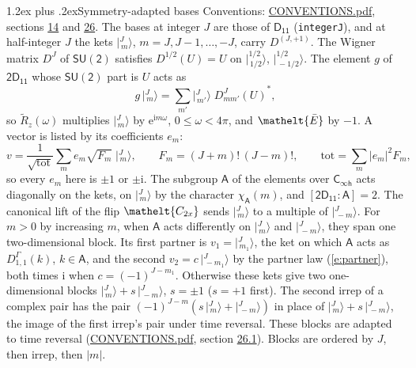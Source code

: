 \documentclass[10pt,a4paper]{article}
\makeatletter
\renewcommand\section{\@startsection{section}{1}{\z@}{-3ex plus -1ex minus -.2ex}%
  {1.2ex plus .2ex}{\normalfont\large\sffamily\bfseries\color{parttitle}}}
\numberwithin{equation}{section}
\newcommand{\eltfont}[1]{{\let\sigma\eltsigma\mathelt{#1}}}
\newcommand{\grp}[1]{\mathsf{#1}}
\newcommand{\elt}[1]{\eltfont{#1}}
\newcommand{\grpindex}[2]{[#1 : #2]}
\newcommand{\iunit}{\mathrm{i}}
\newcommand{\expe}{\mathrm{e}}
\newcommand{\irrJp}[2]{D^{(#1,#2)}}
\newcommand{\repD}[1]{D^{#1}}
\newcommand{\wignerD}[1]{D^{#1}}
\newcommand{\chiA}{\chi_{\grp{A}}}
\newcommand{\conj}[1]{{#1}^{*}}
\newcommand{\jm}[2]{\bigl\lvert{}^{#1}_{\,#2}\bigr\rangle}
\newcommand{\barred}[1]{\bar{#1}}
\newcommand{\lift}[1]{\tilde{#1}}
\makeatother
\begin{document}
\section{Symmetry-adapted bases}\label{s:bases}
Conventions: \href{../../CONVENTIONS.pdf}{CONVENTIONS.pdf}, sections \href{../../../rotation/CONVENTIONS.pdf\#conv.14}{14} and \href{../../CONVENTIONS.pdf\#conv.26}{26}.
\leavevmode\label{n:index.m}\label{n:vector.ket}The bases at integer $J$ are those of \href{../../../rotation/data/pdf/D11.pdf}{$\grp{D_{11}}$} (\texttt{integerJ}), and at half-integer $J$ the kets $\jm{J}{m}$, $m = J, J-1, \dots, -J$, carry $\irrJp{J}{+1}$. \label{n:matrix.wigner}The Wigner matrix $\wignerD{J}$ of $\grp{SU(2)}$ satisfies $\wignerD{1/2}(U) = U$ on $\jm{1/2}{1/2}$, $\jm{1/2}{-1/2}$. The element $g$ of $\grp{2D_{11}}$ whose $\grp{SU(2)}$ part is $U$ acts as
\begin{equation}\label{e:action}g\,\jm{J}{m} = \sum_{m'} \jm{J}{m'}\; \conj{\wignerD{J}_{m m'}(U)},\end{equation}
so $\lift{R}_{z}(\omega)$ multiplies $\jm{J}{m}$ by $\expe^{\iunit m\omega}$, $0 \le \omega < 4\pi$, and $\elt{\barred{E}}$ by $-1$. \label{n:index.ketcoefficient}\label{n:vector.basis.symmetry}\label{n:index.ketweight}\label{n:index.total}A vector is listed by its coefficients $e_m$:
\begin{equation}\label{e:ket}v = \frac{1}{\sqrt{\mathrm{tot}}}\sum_m e_m\sqrt{F_m}\;\jm{J}{m},\qquad F_m = (J+m)!\,(J-m)!,\qquad \mathrm{tot} = \sum_m |e_m|^2F_m,\end{equation}
so every $e_m$ here is $\pm 1$ or $\pm\iunit$.
\leavevmode\label{n:group.A}\label{n:function.character.abelian}The subgroup $\grp{A}$ of the elements over $\grp{C_{\infty h}}$ acts diagonally on the kets, on $\jm{J}{m}$ by the character $\chiA(m)$, and $\grpindex{\grp{2D_{11}}}{\grp{A}} = 2$. The canonical lift of the flip $\elt{C_{2x}}$ sends $\jm{J}{m}$ to a multiple of $\jm{J}{-m}$. For $m > 0$ by increasing $m$, when $\grp{A}$ acts differently on $\jm{J}{m}$ and $\jm{J}{-m}$, they span one two-dimensional block. \label{n:index.partner.sign}Its first partner is $v_1 = \jm{J}{m_1}$, the ket on which $\grp{A}$ acts as $\repD{\Gamma}_{1,1}(k)$, $k \in \grp{A}$, and the second $v_2 = c\,\jm{J}{-m_1}$ by the partner law (\ref{e:partner}), both times $\iunit$ when $c = (-1)^{J-m_1}$. \label{n:index.pair.sign}Otherwise these kets give two one-dimensional blocks $\jm{J}{m} + s\,\jm{J}{-m}$, $s = \pm 1$ ($s = +1$ first). The second irrep of a complex pair has the pair $(-1)^{J-m}(s\,\jm{J}{m} + \jm{J}{-m})$ in place of $\jm{J}{m} + s\,\jm{J}{-m}$, the image of the first irrep's pair under time reversal. These blocks are adapted to time reversal (\href{../../CONVENTIONS.pdf}{CONVENTIONS.pdf}, section \href{../../CONVENTIONS.pdf\#conv.26.1}{26.1}). Blocks are ordered by $J$, then irrep, then $|m|$.
\end{document}
